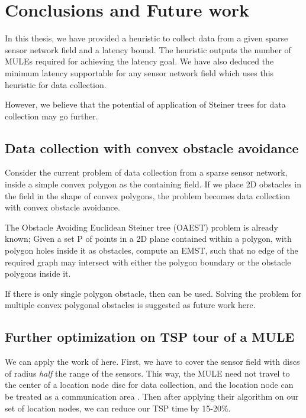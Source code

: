 \chapter{Conclusions and Future work}
\label{chap:concl}

In this thesis, we have provided a heuristic to collect data from a given sparse sensor network field and a latency bound. The heuristic outputs the number of MULEs required for achieving the latency goal. We have also deduced the minimum latency supportable for any sensor network field which uses this heuristic for data collection.

However, we believe that the potential of application of Steiner trees for data collection may go further.

\section{Data collection with convex obstacle avoidance}

Consider the current problem of data collection from a sparse sensor network, inside a simple convex polygon as the containing field. If we place 2D obstacles in the field in the shape of convex polygons, the problem becomes data collection with convex obstacle avoidance.

The Obstacle Avoiding Euclidean Steiner tree (OAEST) problem \cite{oaest99} is already known; Given a set P of points in a 2D plane contained within a polygon, with polygon holes inside it as obstacles, compute an EMST, such that no edge of the required graph may intersect with either the polygon boundary or the obstacle polygons inside it.

If there is only single polygon obstacle, then \cite{oatsp} can be used. Solving the problem for multiple convex polygonal obstacles is suggested as future work here.

\section{Further optimization on TSP tour of a MULE}

We can apply the work of \cite{conHull} here. First, we have to cover the sensor field with discs of radius \emph{half} the range of the sensors. This way, the MULE need not travel to the center of a location node disc for data collection, and the location node can be treated as a communication area \cite{conHull}. Then after applying their algorithm on our set of location nodes, we can reduce our TSP time by 15-20\%.

\singlespacing